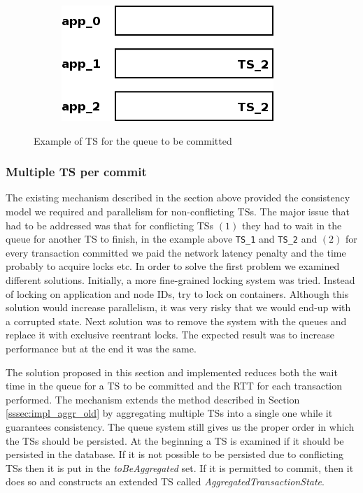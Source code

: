 \begin{figure}
\begin{subfigure}[t]{0.3\textwidth}
    \caption{}
    \label{fig:impl_tx_aggr_sub3}
  \end{subfigure}
  \qquad
  \begin{subfigure}[t]{0.3\textwidth}
    \includegraphics[scale=0.4]{resources/images/Implementation/commit_system_4.png}
    \caption{}
    \label{fig:impl_tx_aggr_sub4}
  \end{subfigure}

  \caption{Example of TS for the queue to be committed}
  \label{fig:impl_tx_aggr_queue}
\end{figure}

\subsubsection{Multiple TS per commit}
\label{sssec:impl_aggr_new}
The existing mechanism described in the section above provided the
consistency model we required and parallelism for
non-conflicting TSs. The major issue that had to be addressed was that
for conflicting TSs $(1)$ they had to wait in the queue for another TS
to finish, in the example above \texttt{TS\_1} and \texttt{TS\_2} and
$(2)$ for every transaction committed we paid the network latency
penalty and the time probably to acquire locks etc. In order to solve
the first problem we examined different solutions. Initially,
a more fine-grained locking system was tried. Instead of locking on application and
node IDs, try to lock on containers. Although this solution would
increase parallelism, it was very risky that we would end-up with a
corrupted state. Next solution was to remove the system with the
queues and replace it with exclusive reentrant locks. The expected
result was to increase performance but at the end it was the same.

The solution proposed in this section and implemented reduces both the
wait time in the queue for a TS to be committed and the RTT for each
transaction performed. The mechanism extends the method described in
Section \ref{sssec:impl_aggr_old} by aggregating multiple TSs into a
single one while it guarantees consistency. The queue system still
gives us the proper order in which the TSs should be persisted. At the
beginning a TS
is examined if it should be persisted in the database. If it is not
possible to be persisted due to conflicting TSs then it is put in the
\emph{toBeAggregated} set. If it is permitted to commit, then it does so
and constructs an extended TS called
\emph{AggregatedTransactionState}.

